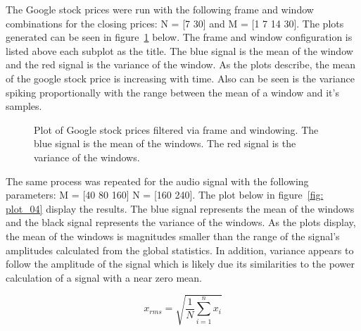 \documentclass[11pt]{article}
\begin{document}
The Google stock prices were run with the following frame and window combinations for the closing prices: N = [7 30] and M = [1 7 14 30]. The plots generated can be seen in figure~\ref{fig: plot_02} below. The frame and window configuration is listed above each subplot as the title. The blue signal is the mean of the window and the red signal is the variance of the window. As the plots describe, the mean of the google stock price is increasing with time. Also can be seen is the variance spiking proportionally with the range between the mean of a window and it's samples.

\begin{figure}[H] %
	\centering 
	\caption{Plot of Google stock prices filtered via frame and windowing. The blue signal is the mean of the windows. The red signal is the variance of the windows.}
	\label{fig: plot_02} 
\end{figure}

The same process was repeated for the audio signal with the following parameters: M = [40 80 160] N = [160 240]. The plot below in figure~\ref{fig: plot_04} display the results. The blue signal represents the mean of the windows and the black signal represents the variance of the windows. As the plots display, the mean of the windows is magnitudes smaller than the range of the signal's amplitudes calculated from the global statistics. In addition, variance appears to follow the amplitude of the signal which is likely due its similarities to the power calculation of a signal with a near zero mean.

\begin{equation}
x_{rms} = \sqrt{\frac{1}{N}\sum_{i=1}^{n}x_i}
\end{equation} 
\end{document}
